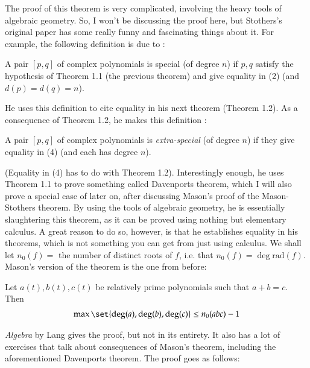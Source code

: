 \documentclass[12pt]{article}
\newenvironment{theorem}{\begin{mytheorem}}{\end{mytheorem}}
\theoremstyle{definitionstyle}
\newenvironment{definition}{\begin{mydef}}{\end{mydef}}
\begin{document}
The proof of this theorem is very complicated, involving the heavy tools of algebraic geometry. So, I won't be discussing the proof here, but Stothers's original paper has some really funny and fascinating things about it. For example, the following definition is due to \cite{10.1093/qmath/32.3.349}:
\begin{definition} 
	A pair $[p, q]$ of complex polynomials is special (of degree $n$) if $p, q$ satisfy the hypothesis of Theorem 1.1 (the previous theorem) and give equality in (2) (and $d(p)=d(q)=n$).
\end{definition}
He uses this definition to cite equality in his next theorem (Theorem 1.2). As a consequence of Theorem 1.2, he makes this definition \cite{10.1093/qmath/32.3.349}:
\begin{definition}
	A pair $[p, q]$ of complex polynomials is \textit{extra-special} (of degree $n$) if they give equality in (4) (and each has degree $n$).
\end{definition} 
(Equality in (4) has to do with Theorem 1.2). Interestingly enough, he uses Theorem 1.1 to prove something called Davenports theorem, which I will also prove a special case of later on, after discussing Mason's proof of the Mason-Stothers theorem. By using the tools of algebraic geometry, he is essentially slaughtering this theorem, as it can be proved using nothing but elementary calculus. A great reason to do so, however, is that he establishes equality in his theorems, which is not something you can get from just using calculus. We  shall let $n_0(f) = $ the number of distinct roots of $f$, i.e. that $n_0(f) = \deg \mathrm{rad}(f)$. Mason's version of the theorem is the one from before:
\begin{theorem}\cite{lang2005algebra}
	Let $a(t), b(t), c(t)$ be relatively prime polynomials such that $a + b = c$. Then
	\begin{align*}
		\max\set{\deg(a), \deg(b), \deg(c)} \leq n_0(abc) - 1
	\end{align*}
\end{theorem}
\textit{Algebra} by Lang gives the proof, but not in its entirety. It also has a lot of exercises that talk about consequences of Mason's theorem, including the aforementioned Davenports theorem. The proof goes as follows:
\end{document}
